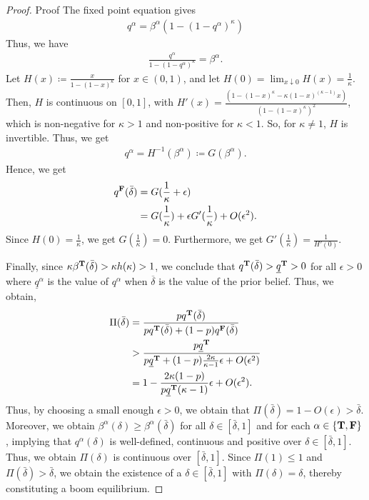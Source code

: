 \begin{proof}{Proof}
The fixed point equation gives 
\begin{align*}
    q^\alpha = \beta^\alpha (1 - (1-q^\alpha)^\kappa)
\end{align*}
Thus, we have 
\begin{align*}
    \frac{q^\alpha }{1 - (1- q^\alpha)^\kappa} = \beta^\alpha.
\end{align*}
Let $H(x) \coloneq \frac{x}{1 - (1 -x)^\kappa}$ for $x \in (0,1)$, and let $H(0) = \lim_{x \downarrow 0} H(x) = \frac{1}{\kappa}$. Then, $H$ is continuous on $[0,1]$, with $H'(x) = \frac{(1 - (1 - x)^\kappa - \kappa (1 - x)^{(\kappa-1)} x)}{(1 - (1 - x)^\kappa)^2}$, which is non-negative for $\kappa > 1$ and non-positive for $\kappa < 1$. So, for $\kappa \neq 1$, $H$ is invertible. Thus, we get
\begin{align*}
    q^\alpha = H^{-1}(\beta^\alpha) \coloneq G(\beta^\alpha).
\end{align*}
Hence, we get
\begin{align*}
    q^{\mathbf{F}}(\bar{\delta}) &= G(\frac{1}{\kappa} + \epsilon)\\
    &= G(\frac{1}{\kappa}) + \epsilon G'(\frac{1}{\kappa}) + O(\epsilon^2).
\end{align*}
Since $H(0) = \frac{1}{\kappa}$, we get $G(\frac{1}{\kappa}) = 0$. Furthermore, we get
$G'(\frac{1}{\kappa}) = \frac{1}{H'(0)}$. 


Finally, since $\kappa \beta^{\mathbf{T}}(\bar{\delta}) > \kappa h(\kappa) > 1$, we conclude that $q^{\mathbf{T}}(\bar{\delta}) > \underline{q}^{\mathbf{T}} > 0$ for all $\epsilon > 0$ where $\underline{q}^{\alpha}$ is the value of $q^\alpha$ when $\overline{\delta}$ is the value of the prior belief. Thus, we obtain,
\begin{align*}
\Pi(\bar{\delta}) &= \frac{pq^{\mathbf{T}}(\bar{\delta})}{pq^{\mathbf{T}}(\bar{\delta}) + (1- p) q^{\mathbf{F}}(\bar{\delta})}\\
&> \frac{p \underline{q}^{\mathbf{T}} } {  p \underline{q}^{\mathbf{T}} + (1 - p) \frac{2\kappa}{\kappa -1} \epsilon + O(\epsilon^2) }\\
&= 1 - \frac{ 2 \kappa(1- p)}{ p\underline{q}^{\mathbf{T}} (\kappa - 1) } \epsilon + O(\epsilon^2). 
\end{align*}
Thus, by choosing a small enough $\epsilon >0$, we obtain that $\Pi(\bar{\delta}) = 1 - O(\epsilon) > \bar{\delta}$. Moreover, we obtain $\beta^\alpha(\delta)  \geq \beta^\alpha(\bar{\delta})$ for all $\delta \in [\bar{\delta}, 1]$ and for each  $\alpha \in \{\mathbf{T}, \mathbf{F}\}$, implying that $q^\alpha(\delta)$ is well-defined, continuous and positive over $\delta \in [\bar{\delta}, 1]$. Thus, we obtain $\Pi(\delta)$ is continuous over $[\bar{\delta}, 1]$. Since $\Pi(1) \leq 1$ and $\Pi(\bar{\delta}) > \bar{\delta}$, we obtain the existence of a $\delta \in [\bar{\delta}, 1]$ with $\Pi(\delta)  = \delta$, thereby constituting a boom equilibrium.



\end{proof}
